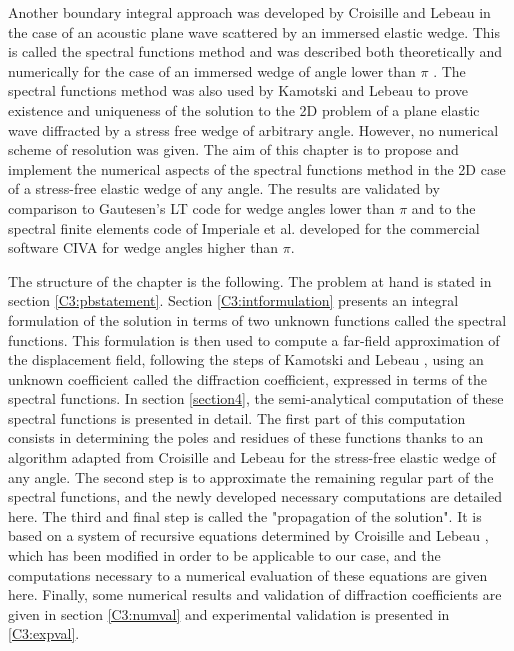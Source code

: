 Another boundary integral approach was developed by Croisille and Lebeau \cite{CroisilleLebeau} in the case of an acoustic plane wave scattered by an immersed elastic wedge. This is called the spectral functions method and was described both theoretically and numerically for the case of an immersed wedge of angle lower than $\pi$ \cite{CroisilleLebeau}. The spectral functions method was also used by Kamotski and Lebeau \cite{KamotskiLebeau} to prove existence and uniqueness of the solution to the 2D problem of a plane elastic wave diffracted by a stress free wedge of arbitrary angle. However, no numerical scheme of resolution was given. The aim of this chapter is to propose and implement the numerical aspects of the spectral functions method in the 2D case of a stress-free elastic wedge of any angle. The results are validated by comparison to Gautesen's LT code \cite{GautesenFradkin} for wedge angles lower than $\pi$ and to the spectral finite elements code of Imperiale et al. developed for the commercial software CIVA \cite{imperiale_ut_2017} for wedge angles higher than $\pi$.

The structure of the chapter is the following. The problem at hand is stated in section \ref{C3:pbstatement}. Section \ref{C3:intformulation} presents an integral formulation of the solution in terms of two unknown functions called the spectral functions. This formulation is then used to compute a far-field approximation of the displacement field, following the steps of Kamotski and Lebeau \cite{KamotskiLebeau}, using an unknown coefficient called the diffraction coefficient, expressed in terms of the spectral functions. In section \ref{section4}, the semi-analytical computation of these spectral functions is presented in detail. The first part of this computation consists in determining the poles and residues of these functions thanks to an algorithm adapted from Croisille and Lebeau \cite{CroisilleLebeau} for the stress-free elastic wedge of any angle. The second step is to approximate the remaining regular part of the spectral functions, and the newly developed necessary computations are detailed here. The third and final step is called the "propagation of the solution". It is based on a system of recursive equations determined by Croisille and Lebeau \cite{CroisilleLebeau}, which has been modified in order to be applicable to our case, and the computations necessary to a numerical evaluation of these equations are given here. Finally, some numerical results and validation of diffraction coefficients are given in section \ref{C3:numval} and experimental validation is presented in \ref{C3:expval}. 
